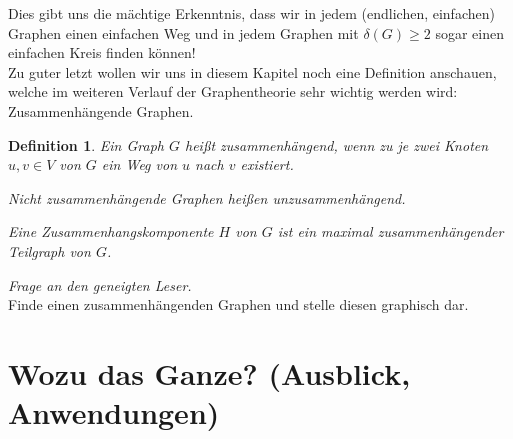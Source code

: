 \documentclass{article}
\newtheorem{definition}{Definition}
\begin{document}
Dies gibt uns die mächtige Erkenntnis, dass wir in jedem (endlichen, einfachen) Graphen einen einfachen Weg und in jedem Graphen mit $\delta(G) \geq 2$ sogar einen einfachen Kreis finden können!\\
\bigskip
Zu guter letzt wollen wir uns in diesem Kapitel noch eine Definition anschauen, welche im weiteren Verlauf der Graphentheorie sehr wichtig werden wird: Zusammenhängende Graphen.\\
\begin{definition}
	Ein Graph $G$ heißt \emph{zusammenhängend}, wenn zu je zwei Knoten $u, v \in V$ von $G$ ein \emph{Weg} von $u$ nach $v$ existiert.
	\par\bigskip
	Nicht zusammenhängende Graphen heißen \emph{unzusammenhängend}.
	\par\bigskip
	Eine \emph{Zusammenhangskomponente} $H$ von $G$ ist ein \emph{maximal zusammenhängender Teilgraph} von $G$.
\end{definition}
\bigskip
\emph{Frage an den geneigten Leser.}\\
Finde einen zusammenhängenden Graphen und stelle diesen graphisch dar.\\

\newpage
\section[Wozu das Ganze?]{Wozu das Ganze? (Ausblick, Anwendungen)}
\end{document}
